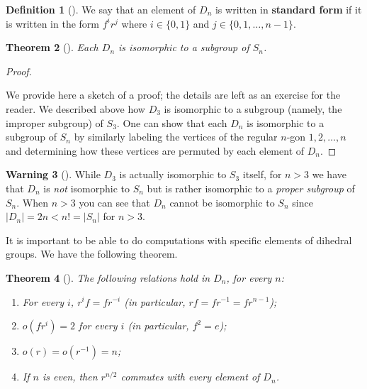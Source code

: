 \documentclass[10pt,]{book}
\newcommand{\terminology}[1]{\textbf{#1}}
\theoremstyle{plain}
\newtheorem{theorem}{Theorem}[section]
\theoremstyle{definition}
\newtheorem{definition}[theorem]{Definition}
\theoremstyle{definition}
\newtheorem{warning}[theorem]{Warning}
\theoremstyle{definition}
\theoremstyle{definition}
\numberwithin{equation}{section}
\newcommand{\lt}{<}
\begin{document}
\begin{definition}[{}]\label{definition-53}
We say that an element of \(D_n\) is written in \terminology{standard form} if it is written in the form \(f^ir^j\) where \(i\in \{0,1\}\) and \(j\in \{0,1,\ldots,n-1\}\).%
\end{definition}
\begin{theorem}[{}]\label{theorem-41}
Each \(D_n\) is isomorphic to a subgroup of \(S_n\).%
\end{theorem}
\begin{proof}\hypertarget{proof-33}{}
We provide here a sketch of a proof; the details are left as an exercise for the reader. We described above how \(D_3\) is isomorphic to a subgroup (namely, the improper subgroup) of \(S_3\). One can show that each \(D_n\) is isomorphic to a subgroup of \(S_n\) by similarly labeling the vertices of the regular \(n\)-gon \(1,2,\ldots, n\) and determining how these vertices are permuted by each element of \(D_n\).%
\end{proof}
\begin{warning}[]\label{warning-22}
While \(D_3\) is actually isomorphic to \(S_3\) itself, for \(n>3\) we have that \(D_n\) is \emph{not} isomorphic to \(S_n\) but is rather isomorphic to a \emph{proper subgroup} of \(S_n\). When \(n>3\) you can see that \(D_n\) cannot be isomorphic to \(S_n\) since \(|D_n|=2n \lt  n! = |S_n|\) for \(n>3\).%
\end{warning}
It is important to be able to do computations with specific elements of dihedral groups. We have the following theorem.%
\begin{theorem}[{}]\label{diords}
The following relations hold in \(D_n\), for every \(n\): \leavevmode%
\begin{enumerate}
\item\hypertarget{li-340}{}For every \(i\), \(r^if=fr^{-i}\) (in particular, \(rf=fr^{-1}=fr^{n-1}\));%
\item\hypertarget{li-341}{}\(o(fr^i)=2\) for every \(i\) (in particular, \(f^2=e\));%
\item\hypertarget{li-342}{}\(o(r)=o(r^{-1})=n\);%
\item\hypertarget{li-343}{}If \(n\) is even, then \(r^{n/2}\) commutes with every element of \(D_n\).%
\end{enumerate}
%
\end{theorem}
\end{document}
